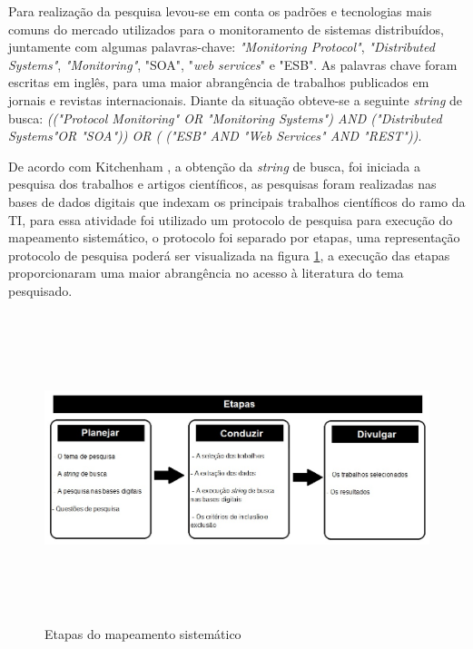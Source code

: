 Para realização da pesquisa levou-se em conta os padrões e tecnologias mais comuns do mercado utilizados para o monitoramento de sistemas distribuídos, juntamente com algumas palavras-chave: \textit{"Monitoring Protocol"}, \textit{"Distributed Systems"}, \textit{"Monitoring"}, "\acrshort{SOA}", "\textit{web services}" e "\acrshort{ESB}". As palavras chave foram escritas em inglês, para uma maior abrangência de trabalhos publicados em jornais e revistas internacionais. Diante da situação obteve-se a seguinte \textit{string} de busca: \textit{(("Protocol Monitoring" OR "Monitoring Systems") AND ("Distributed Systems"OR "SOA")) OR ( ("ESB" AND "Web Services" AND "REST"))}.

De acordo com Kitchenham \cite{kitchenham2007guidelines}, a obtenção da \textit{string} de busca, foi iniciada a pesquisa dos trabalhos e artigos científicos, as pesquisas foram realizadas nas bases de dados digitais que indexam os principais trabalhos científicos do ramo da \acrlong{TI}, para essa atividade foi utilizado um protocolo de pesquisa para execução do mapeamento sistemático, o protocolo foi separado por etapas, uma representação protocolo de pesquisa poderá ser visualizada na figura \ref{fig:etapasRSL}, a execução das etapas proporcionaram uma maior abrangência no acesso à literatura do tema pesquisado.

\begin{figure}[!ht]
\centering
\includegraphics[width = 16cm, height=9cm]{img/etapas_RSL_final.jpg}
\caption{Etapas do mapeamento sistemático \cite{brereton2007lessons}}
\label{fig:etapasRSL}
\end{figure}

